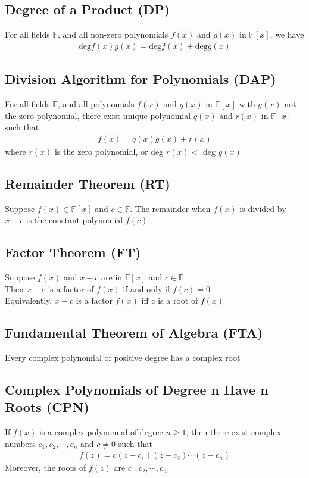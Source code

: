 \documentclass[12pt, letterpaper]{article}
\begin{document}
\subsection{Degree of a Product (DP)}
For all fields $\mathbb{F}$, and all non-zero polynomials $f(x)$ and $g(x)$ in $\mathbb{F}[x]$, we have 
\begin{align*}
    \text{deg} f(x)g(x) = \text{deg} f(x) + \text{deg} g(x)
\end{align*}
\subsection{Division Algorithm for Polynomials (DAP)}
For all fields $\mathbb{F}$, and all polynomials $f(x)$ and $g(x)$ in $\mathbb{F}[x]$ with $g(x)$ not the zero polynomial, 
there exist unique polynomial $q(x)$ and $r(x)$ in $\mathbb{F}[x]$ such that 
\begin{align*}
    f(x) = q(x)g(x) + r(x)
\end{align*}
where $r(x)$ is the zero polynomial, or deg $r(x) < $ deg $g(x)$
\subsection{Remainder Theorem (RT)}
Suppose $f(x) \in \mathbb{F}[x]$ and $c \in \mathbb{F}$. The remainder when $f(x)$ is divided by $x-c$ is the constant polynomial $f(c)$
\subsection{Factor Theorem (FT)}
Suppose $f(x)$ and $x-c$ are in $\mathbb{F}[x]$ and $c \in \mathbb{F}$ \\
Then $x-c$ is a factor of $f(x)$ if and only if $f(c) = 0$ \\
Equivalently, $x-c$ is a factor $f(x)$ iff c is a root of $f(x)$
\subsection{Fundamental Theorem of Algebra (FTA)}
Every complex polynomial of positive degree has a complex root
\subsection{Complex Polynomials of Degree n Have n Roots (CPN)}
If $f(x)$ is a complex polynomial of degree $n \geq 1$, then there exist complex numbers $c_1, c_2, \cdots, c_n$ and $c \neq 0$ such that 
\begin{align*}
    f(z) = c(z-c_1)(z-c_2)\cdots(z-c_n)
\end{align*}
Moreover, the roots of $f(z)$ are $c_1, c_2, \cdots, c_n$
\end{document}
